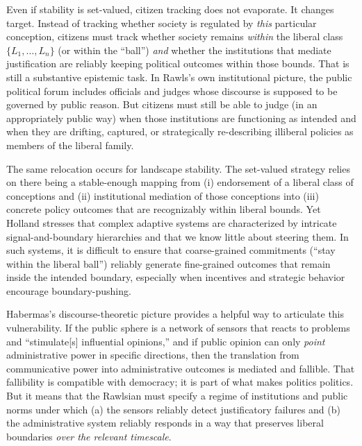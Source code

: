 \documentclass[12pt]{report}
\begin{document}
Even if stability is set-valued, citizen tracking does not evaporate. It changes target. Instead of tracking whether society is regulated by \emph{this} particular conception, citizens must track whether society remains \emph{within} the liberal class $\{L_{1},\ldots,L_{n}\}$ (or within the ``ball'') \emph{and} whether the institutions that mediate justification are reliably keeping political outcomes within those bounds. \parencite[p.~205]{Weithman2023FixedPoints} That is still a substantive epistemic task. In Rawls’s own institutional picture, the public political forum includes officials and judges whose discourse is supposed to be governed by public reason. \parencite[p.~767]{rawls1997public} But citizens must still be able to judge (in an appropriately public way) when those institutions are functioning as intended and when they are drifting, captured, or strategically re-describing illiberal policies as members of the liberal family.

The same relocation occurs for landscape stability. The set-valued strategy relies on there being a stable-enough mapping from (i) endorsement of a liberal class of conceptions and (ii) institutional mediation of those conceptions into (iii) concrete policy outcomes that are recognizably within liberal bounds. Yet Holland stresses that complex adaptive systems are characterized by intricate signal-and-boundary hierarchies and that we know little about steering them. \parencite[p.~1]{holland2012signals} In such systems, it is difficult to ensure that coarse-grained commitments (``stay within the liberal ball'') reliably generate fine-grained outcomes that remain inside the intended boundary, especially when incentives and strategic behavior encourage boundary-pushing.

Habermas’s discourse-theoretic picture provides a helpful way to articulate this vulnerability. If the public sphere is a network of sensors that reacts to problems and ``stimulate[s] influential opinions,'' and if public opinion can only \emph{point} administrative power in specific directions, then the translation from communicative power into administrative outcomes is mediated and fallible. \parencite[p.~9]{habermas1994three} That fallibility is compatible with democracy; it is part of what makes politics politics. But it means that the Rawlsian must specify a regime of institutions and public norms under which (a) the sensors reliably detect justificatory failures and (b) the administrative system reliably responds in a way that preserves liberal boundaries \emph{over the relevant timescale}.
\end{document}
